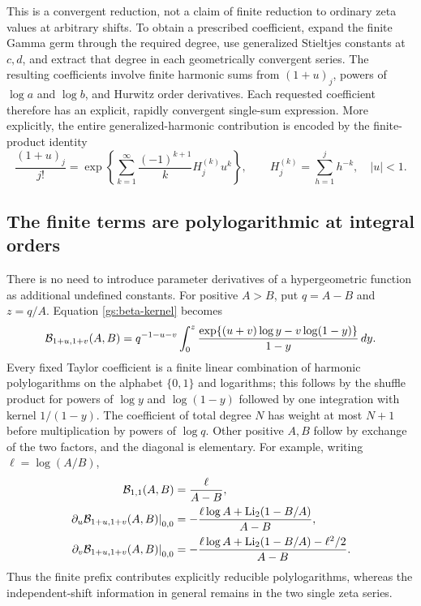 This is a convergent reduction, not a claim of finite reduction to
ordinary zeta values at arbitrary shifts.  To obtain a prescribed
coefficient, expand the finite Gamma germ through the required degree,
use generalized Stieltjes constants at $c,d$, and extract that degree
in each geometrically convergent series.  The resulting coefficients
involve finite harmonic sums from $(1+u)_j$, powers of $\log a$ and
$\log b$, and Hurwitz order derivatives.  Each requested coefficient
therefore has an explicit, rapidly convergent single-sum expression.
More explicitly, the entire generalized-harmonic contribution is
encoded by the finite-product identity
\[
 \frac{(1+u)_j}{j!}
 =\exp\left\{\sum_{k=1}^\infty
        \frac{(-1)^{k+1}}{k}H_j^{(k)}u^k\right\},
 \qquad H_j^{(k)}=\sum_{h=1}^j h^{-k},\quad |u|<1.
\]

\subsection{The finite terms are polylogarithmic at integral orders}

There is no need to introduce parameter derivatives of a hypergeometric
function as additional undefined constants.  For positive $A>B$, put
$q=A-B$ and $z=q/A$.  Equation \eqref{gs:beta-kernel} becomes
\begin{equation}\label{gs:polylog-kernel}
 \mathcal B_{1+u,1+v}(A,B)
 =q^{-1-u-v}\int_0^z
       \frac{\exp\{(u+v)\log y-v\log(1-y)\}}{1-y}\,dy.
\end{equation}
Every fixed Taylor coefficient is a finite linear combination of
harmonic polylogarithms on the alphabet $\{0,1\}$ and logarithms;
this follows by the shuffle product for powers of $\log y$ and
$\log(1-y)$ followed by one integration with kernel $1/(1-y)$.
The coefficient of total degree $N$ has weight at most $N+1$ before
multiplication by powers of $\log q$.  Other positive $A,B$ follow
by exchange of the two factors, and the diagonal is elementary.
For example, writing $\ell=\log(A/B)$,
\begin{align}
 \mathcal B_{1,1}(A,B)&=\frac{\ell}{A-B},\notag\\
 \left.\partial_u\mathcal B_{1+u,1+v}(A,B)\right|_{0,0}
 &=-\frac{\ell\log A+\operatorname{Li}_2(1-B/A)}{A-B},\notag\\
 \left.\partial_v\mathcal B_{1+u,1+v}(A,B)\right|_{0,0}
 &=-\frac{\ell\log A+\operatorname{Li}_2(1-B/A)-\ell^2/2}{A-B}.
 \label{gs:dilog-prefix}
\end{align}
Thus the finite prefix contributes explicitly reducible polylogarithms,
whereas the independent-shift information in general remains in the
two single zeta series.

